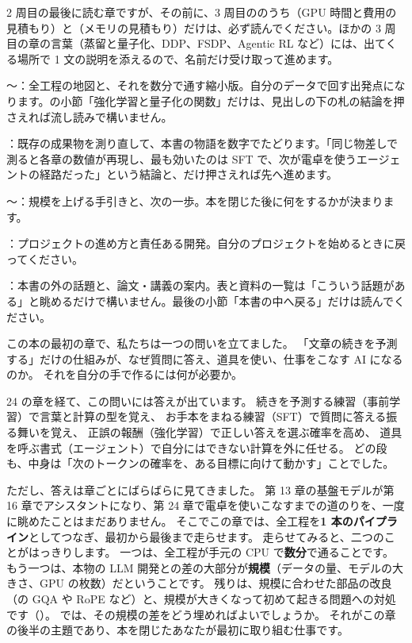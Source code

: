 \begin{readingguide}
\item[\rgpre] 2 周目の最後に読む章ですが、その前に、3 周目ののうち（GPU 時間と費用の見積もり）と（メモリの見積もり）だけは、必ず読んでください。ほかの 3 周目の章の言葉（蒸留と量子化、DDP、FSDP、Agentic RL など）には、出てくる場所で 1 文の説明を添えるので、名前だけ受け取って進めます。
\item[\rgmust] 〜：全工程の地図と、それを数分で通す縮小版。自分のデータで回す出発点になります。の小節「強化学習と量子化の関数」だけは、見出しの下の札の結論を押さえれば流し読みで構いません。
\item[\rgskim] ：既存の成果物を測り直して、本書の物語を数字でたどります。「同じ物差しで測ると各章の数値が再現し、最も効いたのは SFT で、次が電卓を使うエージェントの経路だった」という結論と、だけ押さえれば先へ進めます。
\item[\rgmust] 〜：規模を上げる手引きと、次の一歩。本を閉じた後に何をするかが決まります。
\item[\rglater] ：プロジェクトの進め方と責任ある開発。自分のプロジェクトを始めるときに戻ってください。
\item[\rgskim] ：本書の外の話題と、論文・講義の案内。表と資料の一覧は「こういう話題がある」と眺めるだけで構いません。最後の小節「本書の中へ戻る」だけは読んでください。
\end{readingguide}

この本の最初の章で、私たちは一つの問いを立てました。
「文章の続きを予測する」だけの仕組みが、なぜ質問に答え、道具を使い、仕事をこなす AI になるのか。
それを自分の手で作るには何が必要か。

24 の章を経て、この問いには答えが出ています。
続きを予測する練習（事前学習）で言葉と計算の型を覚え、
お手本をまねる練習（SFT）で質問に答える振る舞いを覚え、
正誤の報酬（強化学習）で正しい答えを選ぶ確率を高め、
道具を呼ぶ書式（エージェント）で自分にはできない計算を外に任せる。
どの段も、中身は「次のトークンの確率を、ある目標に向けて動かす」ことでした。

ただし、答えは章ごとにばらばらに見てきました。
第 13 章の基盤モデルが第 16 章でアシスタントになり、第 24 章で電卓を使いこなすまでの道のりを、一度に眺めたことはまだありません。
そこでこの章では、全工程を\textbf{1 本のパイプライン}としてつなぎ、最初から最後まで走らせます。
走らせてみると、二つのことがはっきりします。
一つは、全工程が手元の CPU で\textbf{数分}で通ることです。
もう一つは、本物の LLM 開発との差の大部分が\textbf{規模}（データの量、モデルの大きさ、GPU の枚数）だということです。
残りは、規模に合わせた部品の改良（の GQA や RoPE など）と、規模が大きくなって初めて起きる問題への対処です（）。
では、その規模の差をどう埋めればよいでしょうか。
それがこの章の後半の主題であり、本を閉じたあなたが最初に取り組む仕事です。

